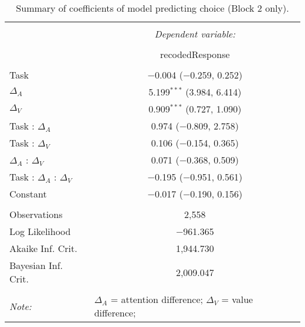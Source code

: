 
\begin{table}[!b] \centering 
  \caption{Summary of coefficients of model predicting choice (Block 2 only).} 
  \label{table:choiceModelBlock2} 
\begin{tabular}{@{\extracolsep{5pt}}lc} 
\\[-1.8ex]\hline 
\hline \\[-1.8ex] 
 & \multicolumn{1}{c}{\textit{Dependent variable:}} \\ 
\cline{2-2} 
\\[-1.8ex] & recodedResponse \\ 
\hline \\[-1.8ex] 
 Task & $-$0.004 ($-$0.259, 0.252) \\ 
  $\Delta_A$ & 5.199$^{***}$ (3.984, 6.414) \\ 
  $\Delta_V$ & 0.909$^{***}$ (0.727, 1.090) \\ 
  Task : $\Delta_A$ & 0.974 ($-$0.809, 2.758) \\ 
  Task : $\Delta_V$ & 0.106 ($-$0.154, 0.365) \\ 
  $\Delta_A$ : $\Delta_V$ & 0.071 ($-$0.368, 0.509) \\ 
  Task : $\Delta_A$ :  $\Delta_V$ & $-$0.195 ($-$0.951, 0.561) \\ 
  Constant & $-$0.017 ($-$0.190, 0.156) \\ 
 \hline \\[-1.8ex] 
Observations & 2,558 \\ 
Log Likelihood & $-$961.365 \\ 
Akaike Inf. Crit. & 1,944.730 \\ 
Bayesian Inf. Crit. & 2,009.047 \\ 
\hline 
\hline \\[-1.8ex] 
\textit{Note:}  & \multicolumn{1}{l}{\footnotesize $\Delta_A$ = attention difference; $\Delta_V$ = value difference;} \\ 
\end{tabular} 
\end{table} 

